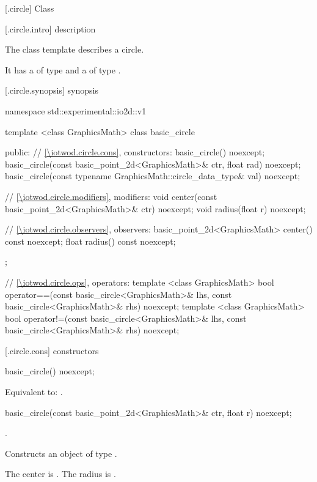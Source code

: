  [\iotwod.circle] {Class }

 [\iotwod.circle.intro] { description}

\pnum
{}%
The class template  describes a circle.

\pnum
It has a  of type  and a  of type .

 [\iotwod.circle.synopsis] { synopsis}

\begin{codeblock}
namespace std::experimental::io2d::v1 {
  template <class GraphicsMath>
  class basic_circle {
  public:
    // \ref{\iotwod.circle.cons}, constructors:
    basic_circle() noexcept;
    basic_circle(const basic_point_2d<GraphicsMath>& ctr, float rad) noexcept;
    basic_circle(const typename GraphicsMath::circle_data_type& val) noexcept;

    // \ref{\iotwod.circle.modifiers}, modifiers:
    void center(const basic_point_2d<GraphicsMath>& ctr) noexcept;
    void radius(float r) noexcept;

    // \ref{\iotwod.circle.observers}, observers:
    basic_point_2d<GraphicsMath> center() const noexcept;
    float radius() const noexcept;
  };

  // \ref{\iotwod.circle.ops}, operators:
  template <class GraphicsMath>
  bool operator==(const basic_circle<GraphicsMath>& lhs,
    const basic_circle<GraphicsMath>& rhs) noexcept;
  template <class GraphicsMath>
  bool operator!=(const basic_circle<GraphicsMath>& lhs,
    const basic_circle<GraphicsMath>& rhs) noexcept;
}
\end{codeblock}

 [\iotwod.circle.cons] { constructors}

%
\begin{itemdecl}
basic_circle() noexcept;
\end{itemdecl}
\begin{itemdescr}
\pnum
\effects
Equivalent to: .
\end{itemdescr}

%
\begin{itemdecl}
basic_circle(const basic_point_2d<GraphicsMath>& ctr, float r) noexcept;
\end{itemdecl}
\begin{itemdescr}
\requires
{}.

\pnum
\effects
Constructs an object of type .

\pnum
The center is . The radius is .
\end{itemdescr}


